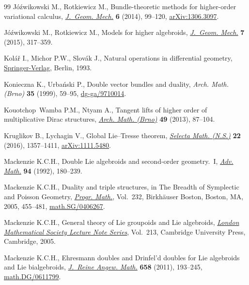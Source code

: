 \documentclass[10pt,a4paper]{amsart}
\numberwithin{equation}{section}
\theoremstyle{definition}
\begin{document}
\begin{thebibliography}{99}
J\'{o}\'{z}wikowski M., Rotkiewicz M., Bundle-theoretic methods for
 higher-order variational calculus, \href{https://doi.org/10.3934/jgm.2014.6.99}{\textit{J.~Geom. Mech.}} \textbf{6} (2014),
 99--120, \href{https://arxiv.org/abs/1306.3097}{arXiv:1306.3097}.

J\'{o}\'{z}wikowski M., Rotkiewicz M., Models for higher algebroids,
 \href{https://doi.org/10.3934/jgm.2015.7.317}{\textit{J.~Geom. Mech.}} \textbf{7} (2015), 317--359.

Kol\'{a}\v{r} I., Michor P.W., Slov\'{a}k J., Natural operations in
 differential geometry, \href{https://doi.org/10.1007/978-3-662-02950-3}{Springer-Verlag}, Berlin, 1993.

Konieczna K., Urba\'{n}ski P., Double vector bundles and duality, \textit{Arch.
 Math. (Brno)} \textbf{35} (1999), 59--95, \href{https://arxiv.org/abs/dg-ga/9710014}{dg-ga/9710014}.

Kouotchop~Wamba P.M., Ntyam A., Tangent lifts of higher order of multiplicative
 {D}irac structures, \href{https://doi.org/10.5817/AM2013-2-87}{\textit{Arch. Math. (Brno)}} \textbf{49} (2013), 87--104.

Kruglikov B., Lychagin V., Global {L}ie--{T}resse theorem, \href{https://doi.org/10.1007/s00029-015-0220-z}{\textit{Selecta
 Math. (N.S.)}} \textbf{22} (2016), 1357--1411, \href{https://arxiv.org/abs/1111.5480}{arXiv:1111.5480}.

Mackenzie K.C.H., Double {L}ie algebroids and second-order geometry.~{I},
 \href{https://doi.org/10.1016/0001-8708(92)90036-K}{\textit{Adv. Math.}} \textbf{94} (1992), 180--239.

Mackenzie K.C.H., Duality and triple structures, in The Breadth of Symplectic
 and {P}oisson Geometry, \href{https://doi.org/10.1007/0-8176-4419-9_15}{\textit{Progr. Math.}}, Vol.~232, Birkh\"{a}user
 Boston, Boston, MA, 2005, 455--481, \href{https://arxiv.org/abs/math.SG/0406267}{math.SG/0406267}.

Mackenzie K.C.H., General theory of {L}ie groupoids and {L}ie algebroids,
 \href{https://doi.org/10.1017/CBO9781107325883}{\textit{London Mathematical Society Lecture Note Series}}, Vol.~213, Cambridge
 University Press, Cambridge, 2005.

Mackenzie K.C.H., Ehresmann doubles and {D}rinfel'd doubles for {L}ie
 algebroids and {L}ie bialgebroids, \href{https://doi.org/10.1515/CRELLE.2011.092}{\textit{J.~Reine Angew. Math.}}
 \textbf{658} (2011), 193--245, \href{https://arxiv.org/abs/math.DG/0611799}{math.DG/0611799}.


\end{thebibliography}
\end{document}
